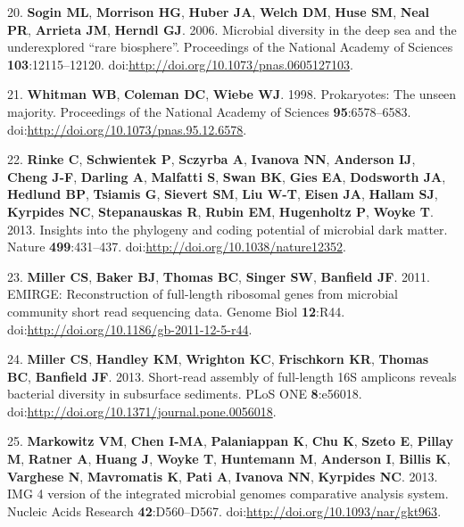 \documentclass[11pt,]{article}
\begin{document}
20. \textbf{Sogin ML}, \textbf{Morrison HG}, \textbf{Huber JA},
\textbf{Welch DM}, \textbf{Huse SM}, \textbf{Neal PR}, \textbf{Arrieta
JM}, \textbf{Herndl GJ}. 2006. Microbial diversity in the deep sea and
the underexplored ``rare biosphere''. Proceedings of the National
Academy of Sciences \textbf{103}:12115--12120.
doi:\url{http://doi.org/10.1073/pnas.0605127103}.

21. \textbf{Whitman WB}, \textbf{Coleman DC}, \textbf{Wiebe WJ}. 1998.
Prokaryotes: The unseen majority. Proceedings of the National Academy of
Sciences \textbf{95}:6578--6583.
doi:\url{http://doi.org/10.1073/pnas.95.12.6578}.

22. \textbf{Rinke C}, \textbf{Schwientek P}, \textbf{Sczyrba A},
\textbf{Ivanova NN}, \textbf{Anderson IJ}, \textbf{Cheng J-F},
\textbf{Darling A}, \textbf{Malfatti S}, \textbf{Swan BK}, \textbf{Gies
EA}, \textbf{Dodsworth JA}, \textbf{Hedlund BP}, \textbf{Tsiamis G},
\textbf{Sievert SM}, \textbf{Liu W-T}, \textbf{Eisen JA}, \textbf{Hallam
SJ}, \textbf{Kyrpides NC}, \textbf{Stepanauskas R}, \textbf{Rubin EM},
\textbf{Hugenholtz P}, \textbf{Woyke T}. 2013. Insights into the
phylogeny and coding potential of microbial dark matter. Nature
\textbf{499}:431--437. doi:\url{http://doi.org/10.1038/nature12352}.

23. \textbf{Miller CS}, \textbf{Baker BJ}, \textbf{Thomas BC},
\textbf{Singer SW}, \textbf{Banfield JF}. 2011. EMIRGE: Reconstruction
of full-length ribosomal genes from microbial community short read
sequencing data. Genome Biol \textbf{12}:R44.
doi:\url{http://doi.org/10.1186/gb-2011-12-5-r44}.

24. \textbf{Miller CS}, \textbf{Handley KM}, \textbf{Wrighton KC},
\textbf{Frischkorn KR}, \textbf{Thomas BC}, \textbf{Banfield JF}. 2013.
Short-read assembly of full-length 16S amplicons reveals bacterial
diversity in subsurface sediments. PLoS ONE \textbf{8}:e56018.
doi:\url{http://doi.org/10.1371/journal.pone.0056018}.

25. \textbf{Markowitz VM}, \textbf{Chen I-MA}, \textbf{Palaniappan K},
\textbf{Chu K}, \textbf{Szeto E}, \textbf{Pillay M}, \textbf{Ratner A},
\textbf{Huang J}, \textbf{Woyke T}, \textbf{Huntemann M},
\textbf{Anderson I}, \textbf{Billis K}, \textbf{Varghese N},
\textbf{Mavromatis K}, \textbf{Pati A}, \textbf{Ivanova NN},
\textbf{Kyrpides NC}. 2013. IMG 4 version of the integrated microbial
genomes comparative analysis system. Nucleic Acids Research
\textbf{42}:D560--D567. doi:\url{http://doi.org/10.1093/nar/gkt963}.
\end{document}
